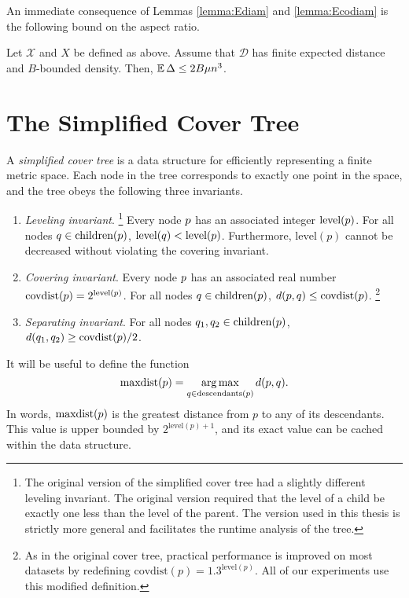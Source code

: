 \documentclass[../main.tex]{subfiles}
\newcommand{\set}[1]{\mathcal {#1}}
\newcommand{\distribution}[1]{\mathcal {#1}}
\newcommand{\dist}[2]{\distf({#1},{#2})}
\newcommand{\distf}{d}
\newcommand{\aspect}[1]{\Delta}
\newcommand{\p}{\ensuremath p}
\newcommand{\q}{\ensuremath q}
\newcommand{\mkfunction}[1]{\ensuremath{\text{{#1}}}}
\newcommand{\level}[1]      {\mkfunction{level}({#1})}
\newcommand{\children}[1]   {\mkfunction{children}({#1})}
\newcommand{\covdist}[1]    {\mkfunction{covdist}({#1})}
\newcommand{\descendants}[1]{\mkfunction{descendants}({#1})}
\newcommand{\maxdist}[1]    {\mkfunction{maxdist}({#1})}
\begin{document}
An immediate consequence of Lemmas \ref{lemma:Ediam} and \ref{lemma:Ecodiam} is the following bound on the aspect ratio.

\begin{lemma}
    \label{lemma:Easpect}
    Let $\set X$ and $X$ be defined as above.
    Assume that $\distribution D$ has finite expected distance and $B$-bounded density.
    Then, $\E\aspect{X} \le2B\mu n^3$. 
\end{lemma}


\section{The Simplified Cover Tree}

A \emph{simplified cover tree} is a data structure for efficiently representing a finite metric space.
Each node in the tree corresponds to exactly one point in the space,
and the tree obeys the following three invariants.
\begin{enumerate}
    \item \emph{Leveling invariant}.%
    \footnote{
        The original version of the simplified cover tree \citep{izbicki2015faster} had a slightly different leveling invariant.
        The original version required that the level of a child be exactly one less than the level of the parent.
        The version used in this thesis is strictly more general and facilitates the runtime analysis of the tree.
    }
    Every node $\p$ has an associated integer $\level\p$.
    For all nodes $\q\in\children\p$, $\level\q < \level\p$.
    Furthermore, $\level p$ cannot be decreased without violating the covering invariant.
    \item \emph{Covering invariant}.
    Every node $\p$ has an associated real number $\covdist\p=2^{\level\p}$.
    For all nodes $\q\in\children\p$, $\dist \p \q \le \covdist\p$.%
    \footnote{
        As in the original cover tree, practical performance is improved on most datasets by redefining $\covdist p = 1.3 ^ {\level p}$.
        All of our experiments use this modified definition.
    }
    \item \emph{Separating invariant}.
    For all nodes $\q_1,\q_2\in\children\p$, $\dist {\q_1} {\q_2} \ge \covdist\p/2$.
\end{enumerate}
It will be useful to define the function
\begin{equation}
\maxdist p = \argmax_{q\in\descendants{p}} \dist p q
.
\end{equation}
In words, $\maxdist\p$ is the greatest distance from $p$ to any of its descendants.
This value is upper bounded by $2^{\level{p}+1}$, 
and its exact value can be cached within the data structure.
\end{document}
